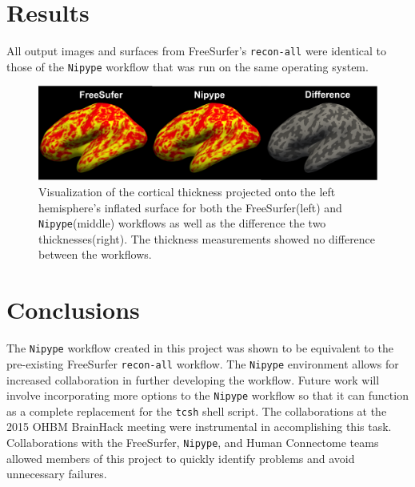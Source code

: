 \documentclass[twocolumn]{bmcart}%
\begin{document}
\section{Results}\label{results}

All output images and surfaces from FreeSurfer's \texttt{recon-all} were identical to those of the \texttt{Nipype} workflow that was run on the same operating system.

\begin{figure}[h]
\centering
\includegraphics[width=.45\textwidth]{FS6NipypeDiff.png}
\caption{Visualization of the cortical thickness projected onto the left hemisphere's inflated surface for both the FreeSurfer(left) and \texttt{Nipype}(middle) workflows as well as the difference the two thicknesses(right). The thickness measurements showed no difference between the workflows.}
\end{figure}
%
%

\section{Conclusions}\label{conclusions}

The \texttt{Nipype} workflow created in this project was shown to be equivalent to the pre-existing FreeSurfer \texttt{recon-all} workflow. The \texttt{Nipype} environment allows for increased collaboration in further developing the workflow. Future work will involve incorporating more options to the \texttt{Nipype} workflow so that it can function as a complete replacement for the \texttt{tcsh} shell script. The collaborations at the 2015 OHBM BrainHack meeting were instrumental in accomplishing this task. Collaborations with the FreeSurfer, \texttt{Nipype}, and Human Connectome teams allowed members of this project to quickly identify problems and avoid unnecessary failures.

\end{document}
